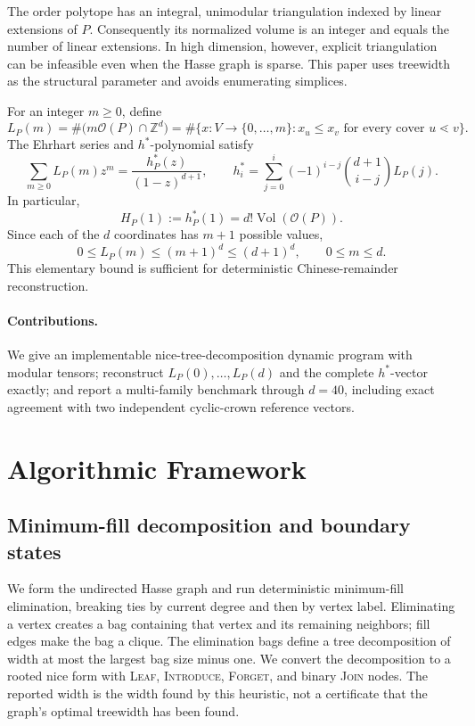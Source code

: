 \documentclass[10pt]{article}
\begin{document}
The order polytope has an integral, unimodular triangulation indexed by linear extensions of $P$. Consequently its normalized volume is an integer and equals the number of linear extensions. In high dimension, however, explicit triangulation can be infeasible even when the Hasse graph is sparse. This paper uses treewidth as the structural parameter and avoids enumerating simplices.

For an integer $m\geq0$, define
\[
L_P(m)=\#\bigl(m\mathcal{O}(P)\cap\mathbb{Z}^d\bigr)
=\#\{x:V\to\{0,\ldots,m\}:x_u\leq x_v\text{ for every cover }u\lessdot v\}.
\]
The Ehrhart series and $h^*$-polynomial satisfy
\[
\sum_{m\geq0}L_P(m)z^m=\frac{h_P^*(z)}{(1-z)^{d+1}},
\qquad
h_i^*=\sum_{j=0}^{i}(-1)^{i-j}\binom{d+1}{i-j}L_P(j).
\]
In particular,
\[
H_P(1):=h_P^*(1)=d!\operatorname{Vol}(\mathcal{O}(P)).
\]
Since each of the $d$ coordinates has $m+1$ possible values,
\[
0\leq L_P(m)\leq(m+1)^d\leq(d+1)^d,\qquad 0\leq m\leq d.
\]
This elementary bound is sufficient for deterministic Chinese-remainder reconstruction.

\paragraph{Contributions.}
We give an implementable nice-tree-decomposition dynamic program with modular tensors; reconstruct $L_P(0),\ldots,L_P(d)$ and the complete $h^*$-vector exactly; and report a multi-family benchmark through $d=40$, including exact agreement with two independent cyclic-crown reference vectors.

\section{Algorithmic Framework}

\subsection{Minimum-fill decomposition and boundary states}

We form the undirected Hasse graph and run deterministic minimum-fill elimination, breaking ties by current degree and then by vertex label. Eliminating a vertex creates a bag containing that vertex and its remaining neighbors; fill edges make the bag a clique. The elimination bags define a tree decomposition of width at most the largest bag size minus one. We convert the decomposition to a rooted nice form with \textsc{Leaf}, \textsc{Introduce}, \textsc{Forget}, and binary \textsc{Join} nodes. The reported width is the width found by this heuristic, not a certificate that the graph's optimal treewidth has been found.
\end{document}
